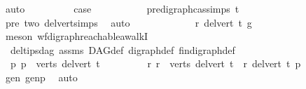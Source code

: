 \begin{isabellebody}
\ auto\isanewline
\ \ \ \ \ \ \isamarkupfalse%
\ \isamarkupfalse%
\ {\isacharquery}{\kern0pt}case\ \isanewline
\ \ \ \ \ \ \ \ \isamarkupfalse%
\ pre{\isacharunderscore}{\kern0pt}digraph{\isachardot}{\kern0pt}cas{\isachardot}{\kern0pt}simps{\isacharparenleft}{\kern0pt}{}{\isacharparenright}{\kern0pt}\ t\isanewline
\ \ \ \ \ \ \ \ \isamarkupfalse%
\ pre\ two\ del{\isacharunderscore}{\kern0pt}vert{\isacharunderscore}{\kern0pt}simps{\isacharparenleft}{\kern0pt}{}{\isacharparenright}{\kern0pt}\ \isamarkupfalse%
\ auto\isanewline
\ \ \ \ \isamarkupfalse%
\isanewline
\ \ \isamarkupfalse%
\isanewline
\ \ \isamarkupfalse%
\ \isamarkupfalse%
\ {\isachardoublequoteopen}r\ {\isasymrightarrow}\isactrlsup {\isacharasterisk}{\kern0pt}\isactrlbsub del{\isacharunderscore}{\kern0pt}vert\ t\isactrlesub \ g{\isachardoublequoteclose}\ \isamarkupfalse%
\ {\isacharparenleft}{\kern0pt}meson\ wf{\isacharunderscore}{\kern0pt}digraph{\isachardot}{\kern0pt}reachable{\isacharunderscore}{\kern0pt}awalkI\ \ \isanewline
\ \ del{\isacharunderscore}{\kern0pt}tips{\isacharunderscore}{\kern0pt}dag\ assms{\isacharparenleft}{\kern0pt}{}{\isacharparenright}{\kern0pt}\ DAG{\isacharunderscore}{\kern0pt}def\ digraph{\isacharunderscore}{\kern0pt}def\ fin{\isacharunderscore}{\kern0pt}digraph{\isacharunderscore}{\kern0pt}def{\isacharparenright}{\kern0pt}\isanewline
{}\isamarkupfalse%
\isanewline
\ \ \isamarkupfalse%
\ \isamarkupfalse%
\ {\isachardoublequoteopen}\ {\isasymexists}p{\isachardot}{\kern0pt}\ p\ {\isasymin}\ verts\ {\isacharparenleft}{\kern0pt}del{\isacharunderscore}{\kern0pt}vert\ t{\isacharparenright}{\kern0pt}\ {\isasymand}\isanewline
\ \ \ \ \ \ \ \ {\isacharparenleft}{\kern0pt}{\isasymforall}r{\isachardot}{\kern0pt}\ r\ {\isasymin}\ verts\ {\isacharparenleft}{\kern0pt}del{\isacharunderscore}{\kern0pt}vert\ t{\isacharparenright}{\kern0pt}\ {\isasymlongrightarrow}\ r\ {\isasymrightarrow}\isactrlsup {\isacharasterisk}{\kern0pt}\isactrlbsub del{\isacharunderscore}{\kern0pt}vert\ t\isactrlesub \ p{\isacharparenright}{\kern0pt}{\isachardoublequoteclose}\isanewline
\ \ \ \ \isamarkupfalse%
\ gen\ genp\ \isamarkupfalse%
\ auto\isanewline
{}\isamarkupfalse%
%
\endisatagproof
{\isafoldproof}%
%
\isadelimproof
%
\endisadelimproof
%
\isadelimdocument
%
\endisadelimdocument
%
\isatagdocument
%
\end{isabellebody}

